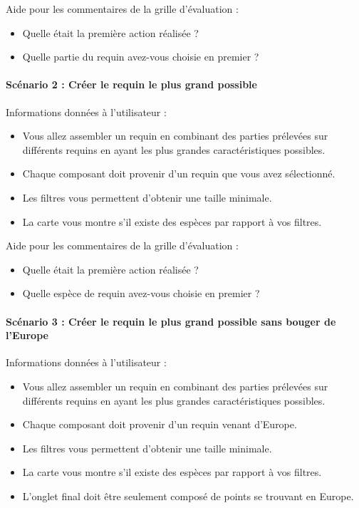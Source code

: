 \documentclass{article}
\begin{document}
Aide pour les commentaires de la grille d'évaluation :
\begin{itemize}
    \item Quelle était la première action réalisée ?
    \item Quelle partie du requin avez-vous choisie en premier ?
\end{itemize}

\paragraph{Scénario 2 : Créer le requin le plus grand possible}
Informations données à l'utilisateur :
\begin{itemize}
    \item Vous allez assembler un requin en combinant des parties prélevées sur différents requins en ayant les plus grandes caractéristiques possibles.
    \item Chaque composant doit provenir d'un requin que vous avez sélectionné.
    \item Les filtres vous permettent d'obtenir une taille minimale.
    \item La carte vous montre s'il existe des espèces par rapport à vos filtres.
\end{itemize}

Aide pour les commentaires de la grille d'évaluation :
\begin{itemize}
    \item Quelle était la première action réalisée ?
    \item Quelle espèce de requin avez-vous choisie en premier ?
\end{itemize}

\paragraph{Scénario 3 : Créer le requin le plus grand possible sans bouger de l'Europe}
Informations données à l'utilisateur :
\begin{itemize}
    \item Vous allez assembler un requin en combinant des parties prélevées sur différents requins en ayant les plus grandes caractéristiques possibles.
    \item Chaque composant doit provenir d'un requin venant d'Europe.
    \item Les filtres vous permettent d'obtenir une taille minimale.
    \item La carte vous montre s'il existe des espèces par rapport à vos filtres.
    \item L'onglet final doit être seulement composé de points se trouvant en Europe.
\end{itemize}
\end{document}
